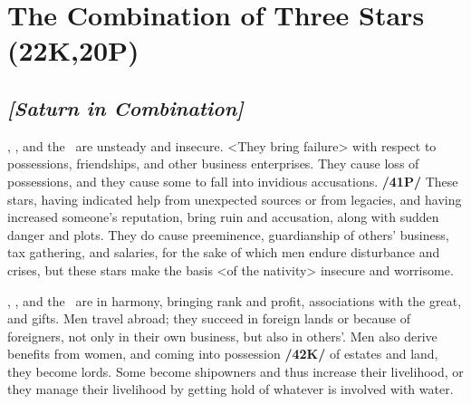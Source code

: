 \section{The Combination of Three Stars (22K,20P)}
\subsection{\textit{[Saturn in Combination]}}
\Saturn, \Jupiter, and the \Sun\, are unsteady and insecure. <They bring failure> with respect to possessions, friendships, and other business enterprises. They cause loss of possessions, and they cause some to fall into invidious accusations. \textbf{/41P/} These stars, having indicated help from unexpected sources or from legacies, and having increased someone’s reputation, bring ruin and accusation, along with sudden danger and plots. They do cause preeminence, guardianship of others’ business, tax gathering, and salaries, for the sake of which men endure disturbance and crises, but these stars make the basis <of the nativity> insecure and worrisome.

\Saturn, \Jupiter, and the \Moon\, are in harmony, bringing rank and profit, associations with the great, and gifts. Men travel abroad; they succeed in foreign lands or because of foreigners, not only in their own business, but also in others’. Men also derive benefits from women, and coming into possession \textbf{/42K/} of estates and land, they become lords. Some become shipowners and thus increase their livelihood, or they manage their livelihood by getting hold of whatever is involved with water.

